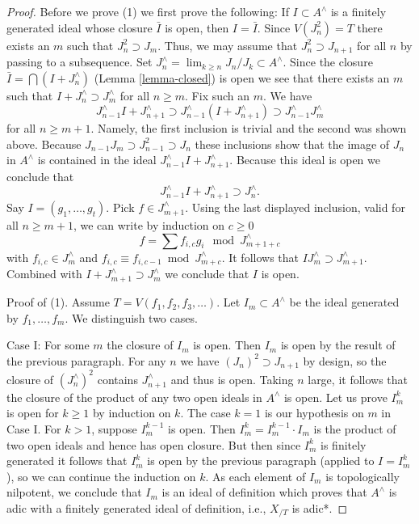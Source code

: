 \documentclass{stacks-project}
\theoremstyle{plain}
\theoremstyle{definition}
\theoremstyle{remark}
\numberwithin{equation}{subsection}
\def\lim{\mathop{\mathrm{lim}}\nolimits}
\begin{document}
\begin{proof}
\medskip\noindent
Before we prove (1) we first prove the following: If $I \subset A^\wedge$ is
a finitely generated ideal whose closure $\bar I$ is open, then $I = \bar I$.
Since $V(J_n^2) = T$ there exists an $m$ such that $J_n^2 \supset J_m$.
Thus, we may assume that $J_n^2 \supset J_{n + 1}$ for all $n$ by passing
to a subsequence. Set $J_n^\wedge = \lim_{k \geq n} J_n/J_k \subset A^\wedge$.
Since the closure $\bar I = \bigcap (I + J_n^\wedge)$
(Lemma \ref{lemma-closed}) is open we see that there exists an $m$ such that
$I + J_n^\wedge \supset J_m^\wedge$ for all $n \geq m$. Fix such an $m$.
We have
$$
J_{n - 1}^\wedge I + J_{n + 1}^\wedge \supset
J_{n - 1}^\wedge (I + J_{n + 1}^\wedge) \supset
J_{n - 1}^\wedge J_m^\wedge
$$
for all $n \geq m + 1$. Namely, the first inclusion is trivial and the
second was shown above. Because $J_{n - 1}J_m \supset J_{n - 1}^2 \supset J_n$
these inclusions show that the image of $J_n$ in $A^\wedge$
is contained in the ideal $J_{n - 1}^\wedge I + J_{n + 1}^\wedge$.
Because this ideal is open we conclude that
$$
J_{n - 1}^\wedge I + J_{n + 1}^\wedge \supset J_n^\wedge.
$$
Say $I = (g_1, \ldots, g_t)$. Pick $f \in J_{m + 1}^\wedge$.
Using the last displayed inclusion, valid for all $n \geq m + 1$,
we can write by induction on $c \geq 0$
$$
f = \sum f_{i, c} g_i \mod J_{m + 1+ c}^\wedge
$$
with $f_{i, c} \in J_m^\wedge$ and
$f_{i, c} \equiv f_{i, c - 1} \bmod J_{m + c}^\wedge$.
It follows that $IJ_m^\wedge \supset J_{m + 1}^\wedge$.
Combined with $I + J_{m + 1}^\wedge \supset J_m^\wedge$
we conclude that $I$ is open.

\medskip\noindent
Proof of (1). Assume $T = V(f_1, f_2, f_3, \ldots)$.
Let $I_m \subset A^\wedge$ be the ideal generated by $f_1, \ldots, f_m$.
We distinguish two cases.

\medskip\noindent
Case I: For some $m$ the closure of $I_m$ is open.
Then $I_m$ is open by the result of the previous paragraph.
For any $n$ we have $(J_n)^2 \supset J_{n+1}$ by design, so
the closure of $(J_n^\wedge)^2$ contains $J_{n+1}^\wedge$
and thus is open.  Taking $n$ large, it follows that the closure
of the product of any two open ideals in $A^\wedge$ is open.
Let us prove $I_m^k$ is open for $k \ge 1$ by induction on $k$.
The case $k = 1$ is our hypothesis on $m$ in Case I.
For $k > 1$, suppose $I_m^{k - 1}$ is open. Then
$I_m^k = I_m^{k - 1} \cdot I_m$ is the product of two open ideals
and hence has open closure. But then since $I_m^k$
is finitely generated it follows that $I_m^k$
is open by the previous paragraph (applied to $I = I_m^k$),
so we can continue the induction on $k$.
As each element of $I_m$ is topologically nilpotent, we conclude
that $I_m$ is an ideal of definition which proves that $A^\wedge$
is adic with a finitely generated ideal of definition, i.e.,
$X_{/T}$ is adic*.


\end{proof}
\end{document}
